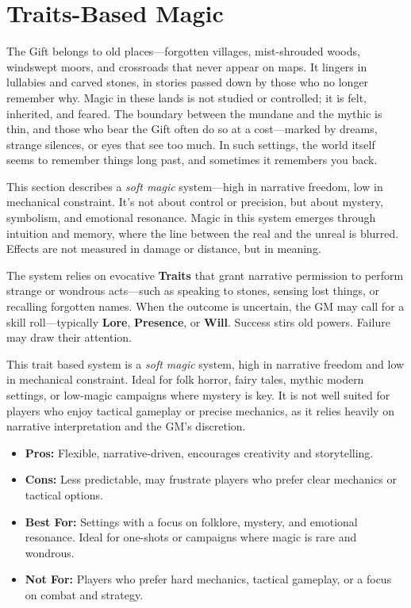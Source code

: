 \section[Traits-Based Magic]{Traits-Based Magic}

\begin{Example}{}
    The Gift belongs to old places—forgotten villages, mist-shrouded woods, windswept moors, and crossroads that never appear on maps. It lingers in lullabies and carved stones, in stories passed down by those who no longer remember why. Magic in these lands is not studied or controlled; it is felt, inherited, and feared. The boundary between the mundane and the mythic is thin, and those who bear the Gift often do so at a cost—marked by dreams, strange silences, or eyes that see too much. In such settings, the world itself seems to remember things long past, and sometimes it remembers you back.
\end{Example}

This section describes a \emph{soft magic} system—high in narrative freedom, low in mechanical constraint. It’s not about control or precision, but about mystery, symbolism, and emotional resonance. Magic in this system emerges through intuition and memory, where the line between the real and the unreal is blurred. Effects are not measured in damage or distance, but in meaning.

The system relies on evocative \textbf{Traits} that grant narrative permission to perform strange or wondrous acts—such as speaking to stones, sensing lost things, or recalling forgotten names. When the outcome is uncertain, the GM may call for a skill roll—typically \textbf{Lore}, \textbf{Presence}, or \textbf{Will}. Success stirs old powers. Failure may draw their attention.

\begin{GmTips}
    This trait based system is a \emph{soft magic} system, high in narrative freedom and low in mechanical constraint. Ideal for folk horror, fairy tales, mythic modern settings, or low-magic campaigns where mystery is key. It is not well suited for players who enjoy tactical gameplay or precise mechanics, as it relies heavily on narrative interpretation and the GM’s discretion.
    \begin{itemize}
        \item \textbf{Pros:} Flexible, narrative-driven, encourages creativity and storytelling.
        \item \textbf{Cons:} Less predictable, may frustrate players who prefer clear mechanics or tactical options.
        \item \textbf{Best For:} Settings with a focus on folklore, mystery, and emotional resonance. Ideal for one-shots or campaigns where magic is rare and wondrous.
        \item \textbf{Not For:} Players who prefer hard mechanics, tactical gameplay, or a focus on combat and strategy.
    \end{itemize}
\end{GmTips}

